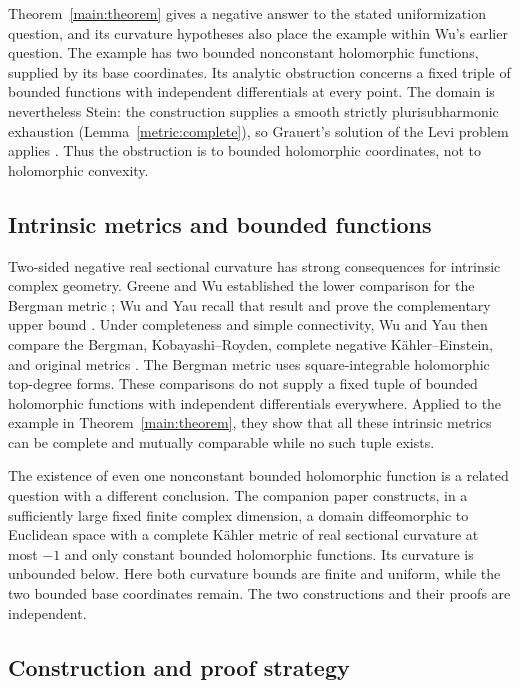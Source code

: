 Theorem~\ref{main:theorem} gives a negative answer to the stated
uniformization question, and its curvature hypotheses also place the
example within Wu's earlier question. The example has two bounded
nonconstant holomorphic functions, supplied by its base coordinates.
Its analytic obstruction concerns a fixed triple of bounded functions
with independent differentials at every point.
The domain is nevertheless Stein: the construction supplies a smooth
strictly plurisubharmonic exhaustion (Lemma~\ref{metric:complete}), so Grauert's solution
of the Levi problem applies \cite[Theorem~2 and Section~3.4]{GrauertLevi1958}.
Thus the obstruction is to bounded holomorphic coordinates, not to
holomorphic convexity.

\subsection{Intrinsic metrics and bounded functions}

Two-sided negative real sectional curvature has strong consequences for
intrinsic complex geometry. Greene and Wu established the lower
comparison for the Bergman metric \cite{GreeneWu1979}; Wu and Yau recall that result and
prove the complementary upper bound
\cite[Theorems~4 and~6]{WuYauInvariant2020}. Under completeness and
simple connectivity, Wu and Yau then compare the Bergman,
Kobayashi--Royden, complete negative K\"ahler--Einstein, and original
metrics \cite[Corollary~7]{WuYauInvariant2020}. The Bergman metric
uses square-integrable holomorphic top-degree forms. These comparisons
do not supply a fixed tuple of bounded holomorphic functions with
independent differentials everywhere. Applied to the example in
Theorem~\ref{main:theorem}, they show that all these intrinsic metrics
can be complete and mutually comparable while no such tuple exists.

The existence of even one nonconstant bounded holomorphic function is
a related question with a different conclusion. The companion paper
\cite[Theorem~1.1]{OpenAIOneSided2026} constructs, in a sufficiently
large fixed finite complex dimension, a domain diffeomorphic to
Euclidean space with a complete K\"ahler metric of real sectional
curvature at most $-1$ and only constant bounded holomorphic functions.
Its curvature is unbounded below. Here both curvature bounds are
finite and uniform, while the two bounded base coordinates remain.
The two constructions and their proofs are independent.

\subsection{Construction and proof strategy}

